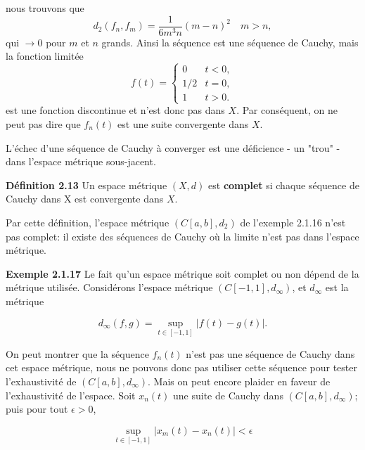 \documentclass[11pt,twoside,a4paper]{article}
\begin{document}


nous trouvons que
\begin{equation*}
  d_2(f_n, f_m) = \frac{1}{6m^3n}(m - n)^2 \quad m > n,
\end{equation*}
qui $\longrightarrow 0$ pour $m$ et $n$ grands. Ainsi la séquence est une séquence de Cauchy, mais la fonction limitée
\begin{equation*}
  f(t) = \begin{cases} 0 & t < 0, \\
    1/2 & t = 0, \\
    1 & t > 0.
        \end{cases}
\end{equation*}
est une fonction discontinue et n'est donc pas dans $X$. Par conséquent, on ne peut pas dire que $f_n(t)$ est une suite convergente dans $X$.

L'échec d'une séquence de Cauchy à converger est une déficience - un "trou" - dans l'espace métrique sous-jacent.

\textbf{Définition 2.13} Un espace métrique $(X, d)$ est \textbf{complet} si chaque séquence de Cauchy dans X est convergente dans $X$.

Par cette définition, l'espace métrique $(C[a, b], d_2)$ de l'exemple 2.1.16 n'est pas complet: il existe des séquences de Cauchy où la limite n'est pas dans l'espace métrique.

\textbf{Exemple 2.1.17} Le fait qu'un espace métrique soit complet ou non dépend de la métrique utilisée. Considérons l'espace métrique $(C[-1, 1], d_\infty)$, et $d_\infty$ est la métrique

\begin{equation*}
  d_\infty(f, g) = \sup_{t \in [-1, 1]} |f(t) - g(t)|.
\end{equation*}

On peut montrer que la séquence $f_n(t)$ n'est pas une séquence de Cauchy dans cet espace métrique, nous ne pouvons donc pas utiliser cette séquence pour tester l'exhaustivité de $(C[a, b], d_\infty)$. Mais on peut encore plaider en faveur de l'exhaustivité de l'espace. 
Soit $x_n(t)$ une suite de Cauchy dans $(C[a, b], d_\infty)$; puis pour tout $\epsilon > 0$,

\begin{equation*}
  \sup_{t \in [-1, 1]} |x_m(t) - x_n(t)| < \epsilon
\end{equation*}
\end{document}
